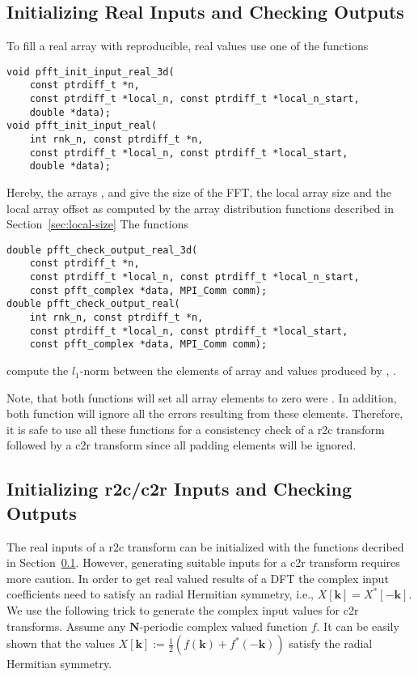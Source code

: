 \subsection{Initializing Real Inputs and Checking Outputs}\label{sec:init-data-3d-r2r}
To fill a real array  with reproducible, real values use one of the functions
\begin{lstlisting}
void pfft_init_input_real_3d(
    const ptrdiff_t *n,
    const ptrdiff_t *local_n, const ptrdiff_t *local_n_start,
    double *data);
void pfft_init_input_real(
    int rnk_n, const ptrdiff_t *n,
    const ptrdiff_t *local_n, const ptrdiff_t *local_start,
    double *data);
\end{lstlisting}
Hereby, the arrays ,  and  give the size of the FFT, the local array size and the local array offset
as computed by the array distribution functions described in Section~\ref{sec:local-size}
The functions
\begin{lstlisting}
double pfft_check_output_real_3d(
    const ptrdiff_t *n,
    const ptrdiff_t *local_n, const ptrdiff_t *local_n_start,
    const pfft_complex *data, MPI_Comm comm);
double pfft_check_output_real(
    int rnk_n, const ptrdiff_t *n,
    const ptrdiff_t *local_n, const ptrdiff_t *local_start,
    const pfft_complex *data, MPI_Comm comm);
\end{lstlisting}
compute the $l_1$-norm between the elements of array  and values produced by , .

Note, that both  functions will set all array elements to zero were .
In addition, both  function will ignore all the errors resulting from these elements.
Therefore, it is safe to use all these functions for a consistency check of a r2c transform followed by a c2r transform since all padding elements will be ignored.


\subsection{Initializing r2c/c2r Inputs and Checking Outputs}\label{sec:init-data-3d-r2c}
The real inputs of a r2c transform can be initialized with the functions decribed in Section~\ref{sec:init-data-3d-r2r}.
However, generating suitable inputs for a c2r transform requires more caution.
In order to get real valued results of a DFT the complex input coefficients need to satisfy an radial Hermitian symmetry, i.e., $X[\mathbf k] = {X^*[-\mathbf k]}$.
We use the following trick to generate the complex input values for c2r transforms.
Assume any $\mathbf N$-periodic complex valued function $f$. It can be easily shown that the values
$X[\mathbf k] := \frac{1}{2}\left(f(\mathbf k)+f^*(-\mathbf k)\right)$ satisfy the radial Hermitian symmetry. 

